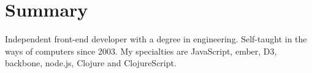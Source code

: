 \documentclass[letterpaper]{deedy-resume} %
\begin{document}
%
%
%
%
%
%
%
%
%
%
%
%


\section{Summary}
\flushleft\location{} %

Independent front-end developer with a degree in engineering. Self-taught
in the ways of computers since 2003. My specialties are JavaScript,
ember, D3, backbone, node.js, Clojure and ClojureScript.
\end{document}
